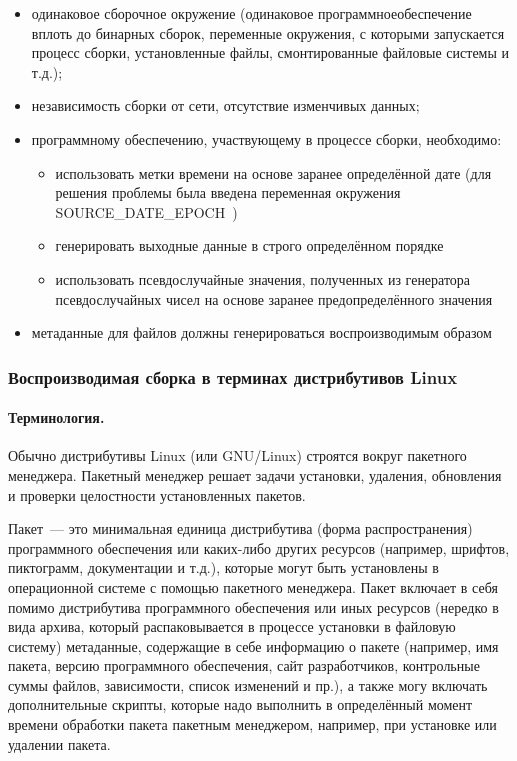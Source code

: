 \documentclass[10pt, a5paper]{article}
\begin{document}
\begin{itemize}
  \item одинаковое сборочное окружение (одинаковое программное\linebreak обеспечение вплоть до бинарных сборок, переменные окружения, с которыми запускается процесс сборки, установленные файлы, смонтированные файловые системы и т.д.);
  \item независимость сборки от сети, отсутствие изменчивых данных;
  \item программному обеспечению, участвующему в процессе сборки, необходимо:\begin{itemize}
  \item использовать метки времени на основе заранее определённой дате (для решения проблемы была введена переменная окружения SOURCE\_DATE\_EPOCH~\cite{Seleznev-5})
  \item генерировать выходные данные в строго определённом порядке
  \item использовать псевдослучайные значения, полученных из генератора псевдослучайных чисел на основе заранее \linebreak предопределённого значения
\end{itemize}


  \item метаданные для файлов должны генерироваться воспроизводимым образом
\end{itemize}

\subsubsection*{Воспроизводимая сборка в терминах дистрибутивов Linux}

\paragraph{Терминология.}

Обычно дистрибутивы Linux (или GNU/Linux) строятся вокруг пакетного менеджера. Пакетный менеджер решает задачи установки, удаления, обновления и проверки целостности установленных пакетов.

Пакет~--- это минимальная единица дистрибутива (форма распространения) программного обеспечения или каких-либо других ресурсов (например, шрифтов, пиктограмм, документации и т.д.), которые могут быть установлены в операционной системе с помощью пакетного менеджера. Пакет включает в себя помимо дистрибутива программного обеспечения или иных ресурсов (нередко в вида архива, который распаковывается в процессе установки в файловую систему) метаданные, содержащие в себе информацию о пакете (например, имя пакета, версию программного обеспечения, сайт разработчиков, контрольные суммы файлов, зависимости, список изменений и пр.), а также могу включать дополнительные скрипты, которые надо выполнить в определённый момент времени обработки пакета пакетным менеджером, например, при установке или удалении пакета.
\end{document}
